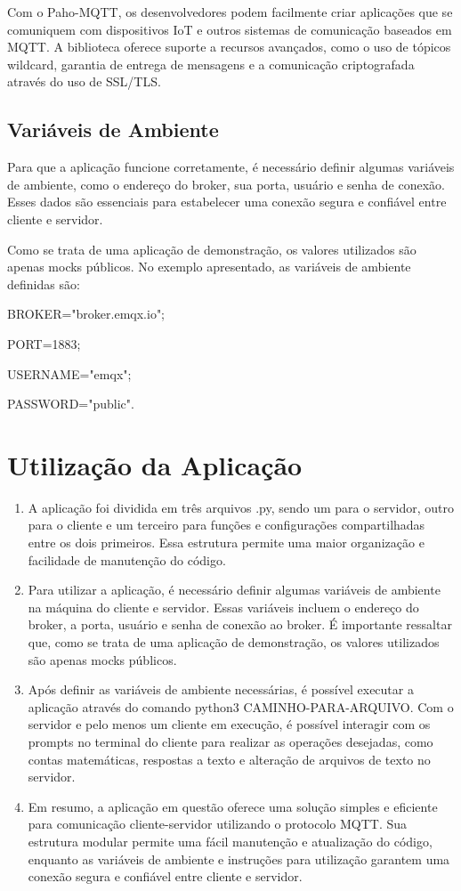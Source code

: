 \documentclass[12pt]{article}
\begin{document}
Com o Paho-MQTT, os desenvolvedores podem facilmente criar aplicações que se comuniquem com dispositivos IoT e outros sistemas de comunicação baseados em MQTT. A biblioteca oferece suporte a recursos avançados, como o uso de tópicos wildcard, garantia de entrega de mensagens e a comunicação criptografada através do uso de SSL/TLS.

\subsection{Variáveis de Ambiente}

Para que a aplicação funcione corretamente, é necessário definir algumas variáveis de ambiente, como o endereço do broker, sua porta, usuário e senha de conexão. Esses dados são essenciais para estabelecer uma conexão segura e confiável entre cliente e servidor.

Como se trata de uma aplicação de demonstração, os valores utilizados são apenas mocks públicos. No exemplo apresentado, as variáveis de ambiente definidas são:

BROKER="broker.emqx.io";

PORT=1883;

USERNAME="emqx";

PASSWORD="public".

\section{Utilização da Aplicação}

\begin{enumerate}  
\item A aplicação foi dividida em três arquivos .py, sendo um para o servidor, outro para o cliente e um terceiro para funções e configurações compartilhadas entre os dois primeiros. Essa estrutura permite uma maior organização e facilidade de manutenção do código.

\item Para utilizar a aplicação, é necessário definir algumas variáveis de ambiente na máquina do cliente e servidor. Essas variáveis incluem o endereço do broker, a porta, usuário e senha de conexão ao broker. É importante ressaltar que, como se trata de uma aplicação de demonstração, os valores utilizados são apenas mocks públicos.

\item Após definir as variáveis de ambiente necessárias, é possível executar a aplicação através do comando python3 CAMINHO-PARA-ARQUIVO. Com o servidor e pelo menos um cliente em execução, é possível interagir com os prompts no terminal do cliente para realizar as operações desejadas, como contas matemáticas, respostas a texto e alteração de arquivos de texto no servidor.

\item Em resumo, a aplicação em questão oferece uma solução simples e eficiente para comunicação cliente-servidor utilizando o protocolo MQTT. Sua estrutura modular permite uma fácil manutenção e atualização do código, enquanto as variáveis de ambiente e instruções para utilização garantem uma conexão segura e confiável entre cliente e servidor.
\end{enumerate}
\end{document}
